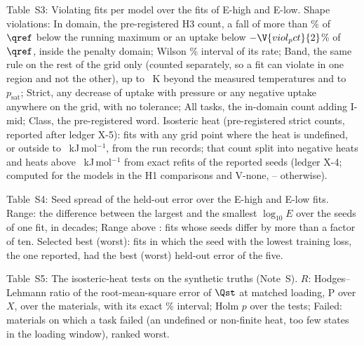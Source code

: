 \documentclass[11pt]{article}
\begin{document}
\begin{landscape}
\begin{table}[h]
\centering
\caption*{Table~S3: Violating fits per model over the  fits of E-high and E-low.
Shape violations: In domain, the pre-registered H3 count, a fall of more than \% of $\qref$ below
the running maximum or an uptake below $-\V{viol_pct}{2}$\% of $\qref$, inside the penalty domain; Wilson
\% interval of its rate; Band, the same rule on the rest of the grid only (counted separately, so a fit can violate in one region and not
the other), up to ~K beyond
the measured temperatures and to ~$p_{\mathrm{sat}}$; Strict, any decrease of uptake with
pressure or any negative uptake anywhere on the grid, with no tolerance; All tasks, the in-domain count adding I-mid;
Class, the pre-registered word. Isosteric heat (pre-registered strict counts, reported
after ledger X-5): fits with any grid point where the heat is undefined, or outside  to ~kJ\,mol$^{-1}$, from the
run records; that count split into negative heats and heats above ~kJ\,mol$^{-1}$ from exact refits
of the reported seeds (ledger X-4; computed for the models in the H1 comparisons and V-none, -- otherwise).}

\end{table}
\end{landscape}

\begin{table}[h]
\centering
\caption*{Table~S4: Seed spread of the held-out error over the E-high and E-low fits. Range: the
difference between the largest and the smallest $\log_{10} E$ over the  seeds of one fit, in decades;
Range above : fits whose seeds differ by more than a factor of ten. Selected best (worst): fits in which the seed with
the lowest training loss, the one reported, had the best (worst) held-out error of the five.}

\end{table}

\begin{table}[h]
\centering
\caption*{Table~S5: The  isosteric-heat tests on the synthetic truths
(Note~S). $R$: Hodges--Lehmann ratio of the root-mean-square error of $\Qst$ at matched
loading, P over $X$, over the  materials, with its exact \% interval; Holm $p$ over
the  tests; Failed: materials on which a task failed (an undefined or non-finite heat, too few
states in the loading window), ranked worst.}

\end{table}
\end{document}
